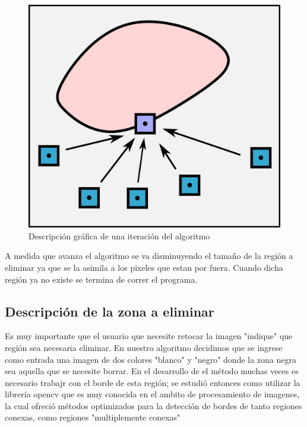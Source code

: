 \documentclass[conference]{IEEEtran}
\begin{document}
\begin{figure}[!ht]
\begin{centering}
\includegraphics[scale=1]{descripcion.png}
\par\end{centering}
\caption{Descripción gráfica de una iteración del algoritmo}
\end{figure}

A medida que avanza el algoritmo se va disminuyendo el tamaño de la región a eliminar ya que se la asimila a los pixeles que estan por fuera. Cuando dicha región ya no existe se termina de correr el programa.

\subsection{Descripción de la zona a eliminar}
Es muy importante que el usuario que necesite retocar la imagen "indique" que región sea necesaria eliminar. En nuestro algoritmo decidimos que se ingrese como entrada una imagen de dos colores "blanco" y "negro" donde la zona negra sea aquella que se necesite borrar. En el desarrollo de el método muchas veces es necesario trabajr con el borde de esta región; se estudió entonces como utilizar la librería opencv que es muy conocida en el ambito de procesamiento de imagenes, la cual ofreció métodos optimizados para la detección de bordes de tanto regiones conexas, como regiones "multiplemente conexas"
\end{document}
